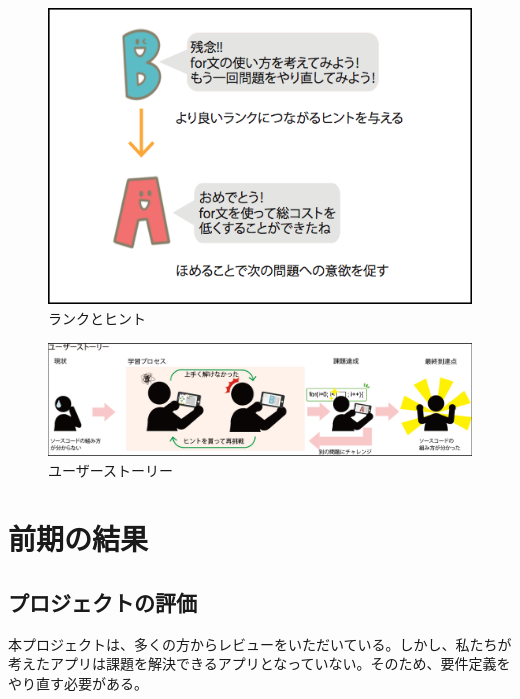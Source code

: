 \documentclass[openany,11pt,papersize]{jsbook}
\begin{document}
\begin{figure}[H]
\begin{center}
\includegraphics[width=12cm, bb=0 0 538 376]{img/5thParagraph/cost.png}
\end{center}
\caption{ランクとヒント}
\end{figure}

\begin{figure}[H]
\begin{center}
\includegraphics[width=14.5cm, bb=0 0 564 129]{img/5thParagraph/userstory.png}
\end{center}
\caption{ユーザーストーリー}
\end{figure}








\chapter{前期の結果}
\section{プロジェクトの評価}
本プロジェクトは、多くの方からレビューをいただいている。しかし、私たちが考えたアプリは課題を解決できるアプリとなっていない。そのため、要件定義をやり直す必要がある。
\end{document}
